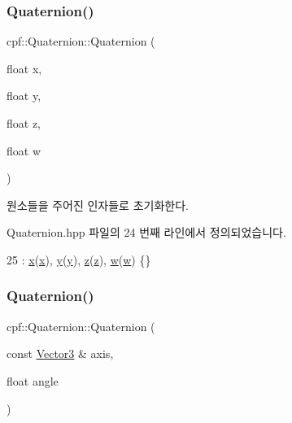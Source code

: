 \subsubsection{\texorpdfstring{Quaternion()}{Quaternion()}\hspace{0.1cm}{\footnotesize\ttfamily [2/4]}}
{\footnotesize\ttfamily cpf\+::\+Quaternion\+::\+Quaternion (\begin{DoxyParamCaption}\item[{float}]{x,  }\item[{float}]{y,  }\item[{float}]{z,  }\item[{float}]{w }\end{DoxyParamCaption})\hspace{0.3cm}{\ttfamily [inline]}}

원소들을 주어진 인자들로 초기화한다. 

Quaternion.\+hpp 파일의 24 번째 라인에서 정의되었습니다.


\begin{DoxyCode}
25             : \hyperlink{classcpf_1_1_quaternion_a200f7bce4e673281af8cc7dd75cb0677}{x}(\hyperlink{classcpf_1_1_quaternion_a200f7bce4e673281af8cc7dd75cb0677}{x}), \hyperlink{classcpf_1_1_quaternion_a4fbade6e58be55a49c94e7f157988136}{y}(\hyperlink{classcpf_1_1_quaternion_a4fbade6e58be55a49c94e7f157988136}{y}), \hyperlink{classcpf_1_1_quaternion_ade9c41b717605118e5fdf95d96a843b4}{z}(\hyperlink{classcpf_1_1_quaternion_ade9c41b717605118e5fdf95d96a843b4}{z}), \hyperlink{classcpf_1_1_quaternion_af312a196b39bb4903b876bc454ac15f8}{w}(\hyperlink{classcpf_1_1_quaternion_af312a196b39bb4903b876bc454ac15f8}{w}) \{\}
\end{DoxyCode}
\mbox{\label{classcpf_1_1_quaternion_a1667174c0626cdd7319cb4f5ec552db3}} 
\subsubsection{\texorpdfstring{Quaternion()}{Quaternion()}\hspace{0.1cm}{\footnotesize\ttfamily [3/4]}}
{\footnotesize\ttfamily cpf\+::\+Quaternion\+::\+Quaternion (\begin{DoxyParamCaption}\item[{const \hyperlink{namespacecpf_a50675f369f5384c7543c7672e3441ba0}{Vector3} \&}]{axis,  }\item[{float}]{angle }\end{DoxyParamCaption})\hspace{0.3cm}{\ttfamily [inline]}}

